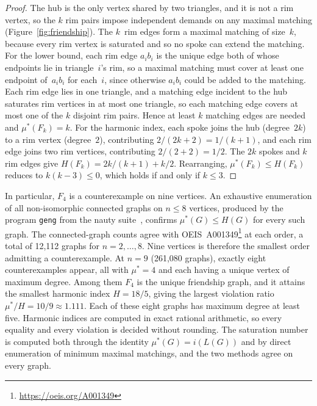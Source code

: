 \documentclass[11pt]{article}
\theoremstyle{definition}
\theoremstyle{remark}
\newcommand{\mustar}{\mu^{*}}
\begin{document}
\begin{proof}
The hub is the only vertex shared by two triangles, and it is not a rim
vertex, so the $k$ rim pairs impose independent demands on any maximal
matching (Figure~\ref{fig:friendship}).  The $k$~rim
edges form a maximal matching of size~$k$, because every rim vertex is
saturated and so no spoke can extend the matching.  For the lower bound,
each rim edge $a_i b_i$ is the unique edge both of whose endpoints lie in
triangle~$i$'s rim, so a maximal matching must cover at least one endpoint
of~$a_i b_i$ for each~$i$, since otherwise $a_i b_i$ could be added to the
matching.  Each rim edge lies in one triangle, and a matching edge incident
to the hub saturates rim vertices in at most one triangle, so each matching
edge covers at most one of the $k$ disjoint rim pairs.  Hence at least $k$
matching edges are needed and $\mustar(F_k) = k$.  For the harmonic index,
each spoke joins the hub (degree~$2k$) to a rim vertex (degree~$2$),
contributing $2/(2k + 2) = 1/(k+1)$, and each rim edge joins two rim
vertices, contributing $2/(2+2) = 1/2$.  The $2k$ spokes and $k$ rim edges
give $H(F_k) = 2k/(k+1) + k/2$.  Rearranging, $\mustar(F_k) \le H(F_k)$
reduces to $k(k-3) \le 0$, which holds if and only if $k \le 3$.
\end{proof}

In particular, $F_4$ is a counterexample on nine vertices.  An exhaustive
enumeration of all non-isomorphic connected graphs on $n \le 8$ vertices,
produced by the program \texttt{geng} from the nauty
suite~\cite{McKay2014nauty}, confirms $\mustar(G) \le H(G)$ for every such
graph.  The connected-graph counts agree with
OEIS~A001349\footnote{\url{https://oeis.org/A001349}} at each order, a
total of 12{,}112 graphs for $n = 2, \ldots, 8$.  Nine vertices is therefore
the smallest order admitting a counterexample.  At $n = 9$ (261{,}080
graphs), exactly eight counterexamples appear, all with $\mustar = 4$ and
each having a unique vertex of maximum degree.  Among them $F_4$ is the
unique friendship graph, and it attains the smallest harmonic index
$H = 18/5$, giving the largest violation ratio
$\mustar/H = 10/9 \approx 1.111$.  Each of these eight graphs has maximum
degree at least five.  Harmonic indices are computed in exact
rational arithmetic, so every equality and every violation is decided
without rounding.  The saturation number is computed both through the
identity $\mustar(G) = i(L(G))$ and by direct enumeration of minimum maximal
matchings, and the two methods agree on every
graph.
\end{document}
